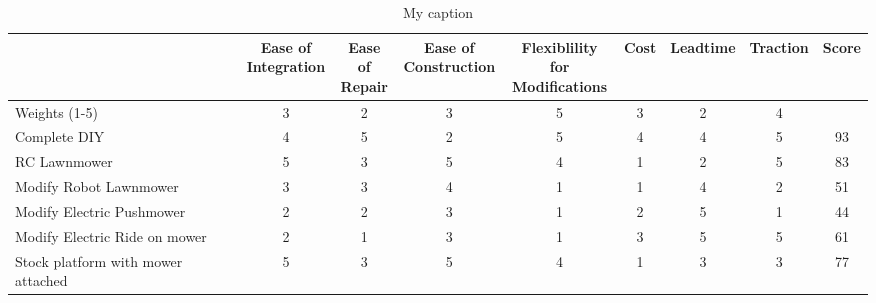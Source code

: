 \documentclass{article}
\begin{document}
		
		\begin{table}[H]
		\begin{adjustwidth}{-1.5in}{-1.5in}

		\begin{tabular}{|l|c|c|c|c|c|c|c|c|}
		\hline
		            & \makecell{Ease of \\ Integration} & \makecell{Ease of \\ Repair} & \makecell{Ease of \\ Construction} & \makecell{Flexiblility for \\ Modifications} & Cost & Leadtime & Traction & Score \\ \hline
		Weights (1-5)                      & 3                   & 2              & 3                    & 5                              & 3    & 2        & 4        &       \\ \hline
		Complete DIY                       & 4                   & 5              & 2                    & 5                              & 4    & 4        & 5        & 93    \\ \hline
		RC Lawnmower                       & 5                   & 3              & 5                    & 4                              & 1    & 2        & 5        & 83    \\ \hline
		Modify Robot Lawnmower             & 3                   & 3              & 4                    & 1                              & 1    & 4        & 2        & 51    \\ \hline
		Modify Electric Pushmower          & 2                   & 2              & 3                    & 1                              & 2    & 5        & 1        & 44    \\ \hline
		Modify Electric Ride on mower      & 2                   & 1              & 3                    & 1                              & 3    & 5        & 5        & 61    \\ \hline
		Stock platform with mower attached & 5                   & 3              & 5                    & 4                              & 1    & 3        & 3        & 77    \\ \hline
		\end{tabular}
		\caption{My caption}
		\label{my-label}
		\end{adjustwidth}
		\end{table}
\end{document}
